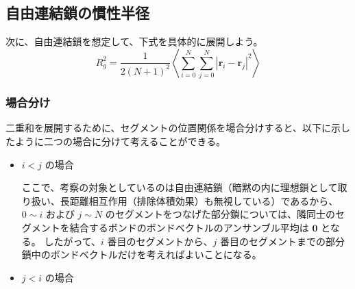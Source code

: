 \documentclass[a4paper,11pt]{ltjsarticle}
\begin{document}
\begin{appendix}
\subsection{自由連結鎖の慣性半径}

次に、自由連結鎖を想定して、下式を具体的に展開しよう。
\begin{equation*}
R_g^2 = \dfrac{1}{2(N+1)^2} \left \langle \sum_{i=0}^N \sum_{j=0}^N \left| \bm{r}_i - \bm{r}_j \right|^2 \right \rangle
\end{equation*}

\subsubsection{場合分け}

二重和を展開するために、セグメントの位置関係を場合分けすると、以下に示したように二つの場合に分けて考えることができる。

\begin{itemize}
\item
$i < j$ の場合


ここで、考察の対象としているのは自由連結鎖（暗黙の内に理想鎖として取り扱い、長距離相互作用（排除体積効果）も無視している）であるから、$0 \sim i$ および $j \sim N$ のセグメントをつなげた部分鎖については、隣同士のセグメントを結合するボンドのボンドベクトルのアンサンブル平均は $\bm{0}$ となる。
したがって、$i$ 番目のセグメントから、$j$ 番目のセグメントまでの部分鎖中のボンドベクトルだけを考えればよいことになる。

\item
$j < i$ の場合



\end{itemize}
\end{appendix}
\end{document}
